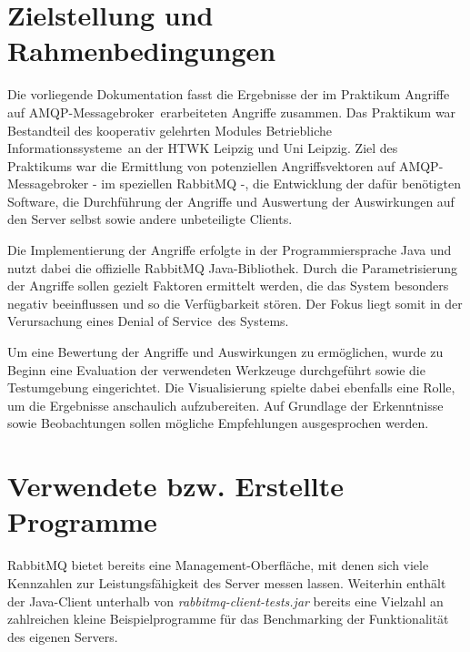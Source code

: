 \documentclass[	a4paper,
			11pt,
			oneside,
			parskip]{scrartcl}
\begin{document}
	
	
\section*{Zielstellung und Rahmenbedingungen}
	
	Die vorliegende Dokumentation fasst die Ergebnisse der im Praktikum \glqq Angriffe auf AMQP-Messagebroker\grqq\ erarbeiteten Angriffe zusammen. Das Praktikum war Bestandteil des kooperativ gelehrten
	Modules \glqq Betriebliche Informationssysteme\grqq\ an der HTWK Leipzig und Uni Leipzig. Ziel des Praktikums war die Ermittlung von potenziellen Angriffsvektoren auf AMQP-Messagebroker - im speziellen RabbitMQ -, die Entwicklung der dafür benötigten Software, die Durchführung der Angriffe und Auswertung der Auswirkungen auf den Server selbst sowie andere unbeteiligte Clients.

	Die Implementierung der Angriffe erfolgte in der Programmiersprache Java und nutzt dabei die offizielle RabbitMQ Java-Bibliothek.
	Durch die Parametrisierung der Angriffe sollen gezielt Faktoren ermittelt werden, die das System besonders negativ beeinflussen und so die Verfügbarkeit stören. Der Fokus liegt somit in der 
	Verursachung eines \glqq Denial of Service\grqq\ des Systems.

	Um eine Bewertung der Angriffe und Auswirkungen zu ermöglichen, wurde zu Beginn eine Evaluation der verwendeten Werkzeuge durchgeführt sowie die Testumgebung eingerichtet. 
	Die Visualisierung spielte dabei ebenfalls eine Rolle, um die Ergebnisse anschaulich aufzubereiten. Auf Grundlage der Erkenntnisse sowie Beobachtungen sollen mögliche Empfehlungen
	ausgesprochen werden.



%	
%
\clearpage
\section*{Verwendete bzw. Erstellte Programme}
	
	RabbitMQ bietet bereits eine Management-Oberfläche, mit denen sich viele Kennzahlen zur Leistungsfähigkeit des Server messen lassen. Weiterhin enthält der Java-Client unterhalb von
	\textit{rabbitmq-client-tests.jar} bereits eine Vielzahl an zahlreichen kleine Beispielprogramme für das Benchmarking der Funktionalität des eigenen Servers.  
	
\end{document}
